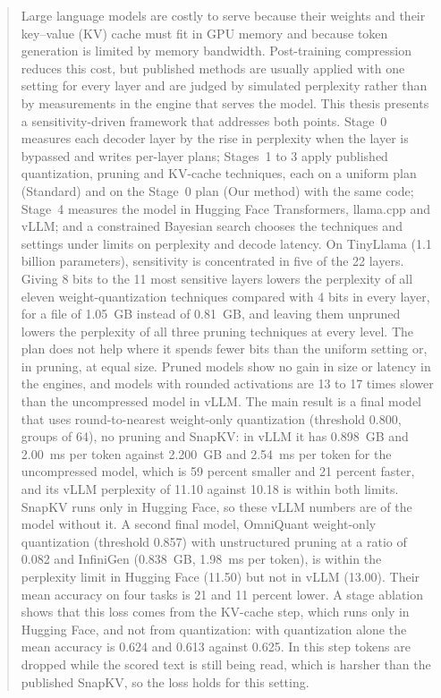 \documentclass[
11pt, %
english, %
singlespacing, %
headsepline, %
]{MastersDoctoralThesis} %
\begin{document}
\begin{abstract}
\addchaptertocentry{\abstractname} %
Large language models are costly to serve because their weights and their key--value (KV) cache must fit in GPU memory and because token generation is limited by memory bandwidth. Post-training compression reduces this cost, but published methods are usually applied with one setting for every layer and are judged by simulated perplexity rather than by measurements in the engine that serves the model. This thesis presents a sensitivity-driven framework that addresses both points. Stage~0 measures each decoder layer by the rise in perplexity when the layer is bypassed and writes per-layer plans; Stages~1 to 3 apply published quantization, pruning and KV-cache techniques, each on a uniform plan (Standard) and on the Stage~0 plan (Our method) with the same code; Stage~4 measures the model in Hugging Face Transformers, llama.cpp and vLLM; and a constrained Bayesian search chooses the techniques and settings under limits on perplexity and decode latency. On TinyLlama (1.1 billion parameters), sensitivity is concentrated in five of the 22 layers. Giving 8 bits to the 11 most sensitive layers lowers the perplexity of all eleven weight-quantization techniques compared with 4 bits in every layer, for a file of 1.05~GB instead of 0.81~GB, and leaving them unpruned lowers the perplexity of all three pruning techniques at every level. The plan does not help where it spends fewer bits than the uniform setting or, in pruning, at equal size. Pruned models show no gain in size or latency in the engines, and models with rounded activations are 13 to 17 times slower than the uncompressed model in vLLM. The main result is a final model that uses round-to-nearest weight-only quantization (threshold 0.800, groups of 64), no pruning and SnapKV: in vLLM it has 0.898~GB and 2.00~ms per token against 2.200~GB and 2.54~ms per token for the uncompressed model, which is 59 percent smaller and 21 percent faster, and its vLLM perplexity of 11.10 against 10.18 is within both limits. SnapKV runs only in Hugging Face, so these vLLM numbers are of the model without it. A second final model, OmniQuant weight-only quantization (threshold 0.857) with unstructured pruning at a ratio of 0.082 and InfiniGen (0.838~GB, 1.98~ms per token), is within the perplexity limit in Hugging Face (11.50) but not in vLLM (13.00). Their mean accuracy on four tasks is 21 and 11 percent lower. A stage ablation shows that this loss comes from the KV-cache step, which runs only in Hugging Face, and not from quantization: with quantization alone the mean accuracy is 0.624 and 0.613 against 0.625. In this step tokens are dropped while the scored text is still being read, which is harsher than the published SnapKV, so the loss holds for this setting.
\end{abstract}
\end{document}
